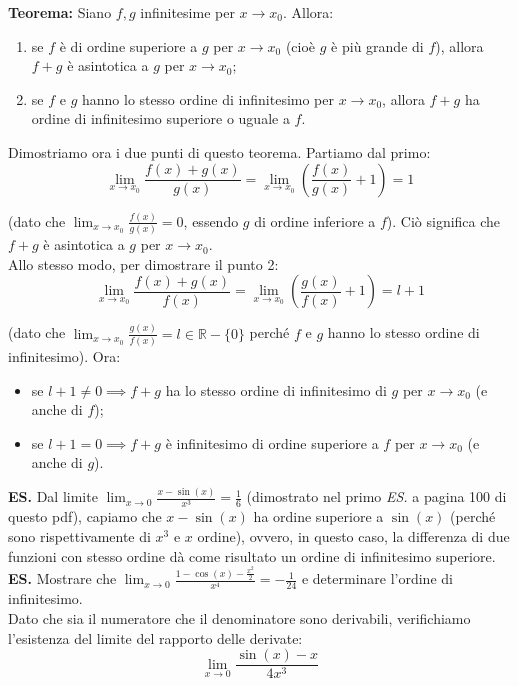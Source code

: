 \documentclass{article}
\begin{document}
\noindent\textbf{Teorema:} Siano $f, g$ infinitesime per $x \to x_0$. Allora:
\begin{enumerate}
    \item se $f$ è di ordine superiore a $g$ per $x \to x_0$ (cioè $g$ è più grande di $f$), allora $f + g$ è asintotica a $g$ per $x \to x_0$;
    \item se $f$ e $g$ hanno lo stesso ordine di infinitesimo per $x \to x_0$, allora $f + g$ ha ordine di infinitesimo superiore o uguale a $f$.
\end{enumerate}

\noindent Dimostriamo ora i due punti di questo teorema. Partiamo dal primo:
\begin{equation*}
    \lim_{x \to x_0} \frac{f(x) + g(x)}{g(x)} = \lim_{x \to x_0} \left(\frac{f(x)}{g(x)} + 1\right) = 1
\end{equation*}

\noindent (dato che $\lim_{x \to x_0} \frac{f(x)}{g(x)} = 0$, essendo $g$ di ordine inferiore a $f$). Ciò significa che $f + g$ è asintotica a $g$ per $x \to x_0$.\\
Allo stesso modo, per dimostrare il punto 2:
\begin{equation*}
    \lim_{x \to x_0} \frac{f(x) + g(x)}{f(x)} = \lim_{x \to x_0} \left(\frac{g(x)}{f(x)} + 1\right) = l + 1
\end{equation*}

\noindent (dato che $\lim_{x \to x_0} \frac{g(x)}{f(x)} = l \in \mathbb{R} - \{0\}$ perché $f$ e $g$ hanno lo stesso ordine di infinitesimo). Ora:
\begin{itemize}
    \item se $l + 1 \neq 0 \implies f + g$ ha lo stesso ordine di infinitesimo di $g$ per $x \to x_0$ (e anche di $f$);
    \item se $l + 1 = 0 \implies f + g$ è infinitesimo di ordine superiore a $f$ per $x \to x_0$ (e anche di $g$).
\end{itemize}

\noindent\textbf{ES.} Dal limite $\lim_{x \to 0} \frac{x - \sin(x)}{x^3} = \frac{1}{6}$ (dimostrato nel primo \textit{ES.} a pagina 100 di questo pdf), capiamo che $x - \sin(x)$ ha ordine superiore a $\sin(x)$ (perché sono rispettivamente di $x^3$ e $x$ ordine), ovvero, in questo caso, la differenza di due funzioni con stesso ordine dà come risultato un ordine di infinitesimo superiore.\\

\noindent\textbf{ES.} Mostrare che $\lim_{x \to 0} \frac{1 - \cos(x) - \frac{x^2}{2}}{x^4} = -\frac{1}{24}$ e determinare l'ordine di infinitesimo.\\
Dato che sia il numeratore che il denominatore sono derivabili, verifichiamo l'esistenza del limite del rapporto delle derivate:
\begin{equation*}
    \lim_{x \to 0} \frac{\sin(x) - x}{4x^3}
\end{equation*}
\end{document}
